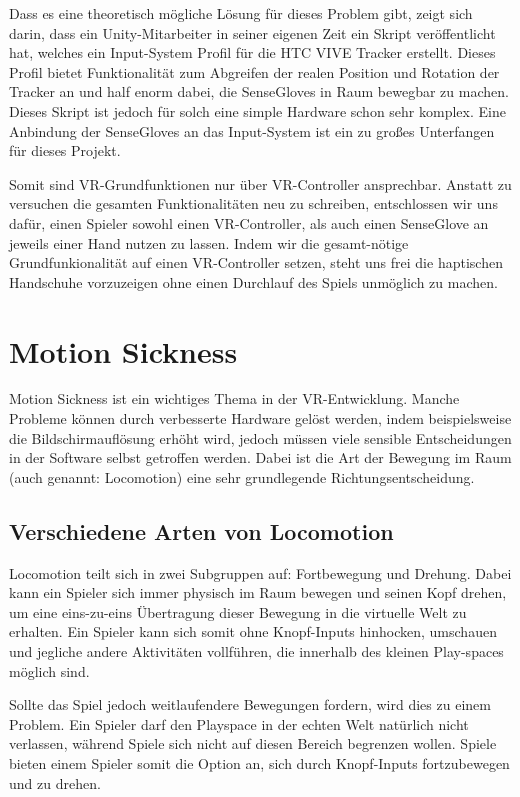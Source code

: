 Dass es eine theoretisch mögliche Lösung für dieses Problem gibt, zeigt sich darin, dass ein Unity-Mitarbeiter in seiner eigenen Zeit ein Skript veröffentlicht hat, welches ein Input-System Profil für die HTC VIVE Tracker erstellt. Dieses Profil bietet Funktionalität zum Abgreifen der realen Position und Rotation der Tracker an und half enorm dabei, die SenseGloves in Raum bewegbar zu machen. Dieses Skript ist jedoch für solch eine simple Hardware schon sehr komplex. Eine Anbindung der SenseGloves an das Input-System ist ein zu großes Unterfangen für dieses Projekt. 

Somit sind VR-Grundfunktionen nur über VR-Controller ansprechbar. Anstatt zu versuchen die gesamten Funktionalitäten neu zu schreiben, entschlossen wir uns dafür, einen Spieler sowohl einen VR-Controller, als auch einen SenseGlove an jeweils einer Hand nutzen zu lassen. Indem wir die gesamt-nötige Grundfunkionalität auf einen VR-Controller setzen, steht uns frei die haptischen Handschuhe vorzuzeigen ohne einen Durchlauf des Spiels unmöglich zu machen.


\section{Motion Sickness}
Motion Sickness ist ein wichtiges Thema in der VR-Entwicklung. Manche Probleme können durch verbesserte Hardware gelöst werden, indem beispielsweise die Bildschirmauflösung erhöht wird, jedoch müssen viele sensible Entscheidungen in der Software selbst getroffen werden. Dabei ist die Art der Bewegung im Raum (auch genannt: \dq Locomotion\dq) eine sehr grundlegende Richtungsentscheidung.

\subsection{Verschiedene Arten von Locomotion}
Locomotion teilt sich in zwei Subgruppen auf: Fortbewegung und Drehung. Dabei kann ein Spieler sich immer physisch im Raum bewegen und seinen Kopf drehen, um eine eins-zu-eins Übertragung dieser Bewegung in die virtuelle Welt zu erhalten. Ein Spieler kann sich somit ohne Knopf-Inputs hinhocken, umschauen und jegliche andere Aktivitäten vollführen, die innerhalb des kleinen Play-spaces möglich sind.

Sollte das Spiel jedoch weitlaufendere Bewegungen fordern, wird dies zu einem Problem. Ein Spieler darf den Playspace in der echten Welt natürlich nicht verlassen, während Spiele sich nicht auf diesen Bereich begrenzen wollen. Spiele bieten einem Spieler somit die Option an, sich durch Knopf-Inputs fortzubewegen und zu drehen.

